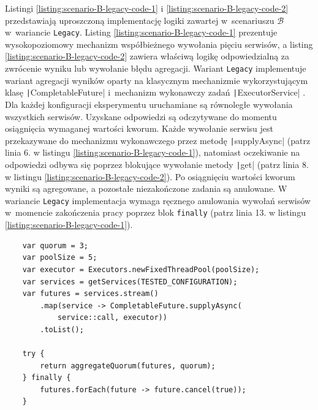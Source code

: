 Listingi \ref{listing:scenario-B-legacy-code-1} i \ref{listing:scenario-B-legacy-code-2} przedstawiają uproszczoną implementację logiki zawartej w~scenariuszu $\mathcal{B}$ w~wariancie \texttt{Legacy}. Listing \ref{listing:scenario-B-legacy-code-1} prezentuje wysokopoziomowy mechanizm współbieżnego wywołania pięciu serwisów, a listing \ref{listing:scenario-B-legacy-code-2} zawiera właściwą logikę odpowiedzialną za zwrócenie wyniku lub wywołanie błędu agregacji.
Wariant \texttt{Legacy} implementuje wariant agregacji wyników oparty na klasycznym mechanizmie wykorzystującym klasę \texttt|CompletableFuture| \cite{java-completable-future} i~mechanizm wykonawczy zadań \texttt|ExecutorService| \cite{java-executor-service}.
Dla każdej konfiguracji eksperymentu uruchamiane są równoległe wywołania wszystkich serwisów. Uzyskane odpowiedzi są odczytywane do momentu osiągnięcia wymaganej wartości kworum. Każde wywołanie serwisu jest przekazywane do mechanizmu wykonawczego przez metodę \texttt|supplyAsync| (patrz linia 6. w listingu \ref{listing:scenario-B-legacy-code-1}), natomiast oczekiwanie na odpowiedzi odbywa się poprzez blokujące wywołanie metody \texttt|get| (patrz linia 8. w listingu \ref{listing:scenario-B-legacy-code-2}). Po osiągnięciu wartości kworum wyniki są agregowane, a pozostałe niezakończone zadania są anulowane. W wariancie \texttt{Legacy} implementacja wymaga ręcznego anulowania wywołań serwisów w~momencie zakończenia pracy poprzez blok \texttt{finally} (patrz linia 13. w listingu \ref{listing:scenario-B-legacy-code-1}).

\begin{listing}[!ht]
    \begin{verbatim}
    var quorum = 3;
    var poolSize = 5;
    var executor = Executors.newFixedThreadPool(poolSize);
    var services = getServices(TESTED_CONFIGURATION);
    var futures = services.stream()
        .map(service -> CompletableFuture.supplyAsync(
            service::call, executor))
        .toList();
    
    try {
        return aggregateQuorum(futures, quorum);
    } finally {
        futures.forEach(future -> future.cancel(true));
    }
    \end{verbatim}
    \caption{Uproszczona implementacja agregacji wyników w oparciu o mechanizm kworum w ramach scenariusza $\mathcal{B}$ w wariancie \texttt{Legacy}}
    \label{listing:scenario-B-legacy-code-1}
\end{listing}

